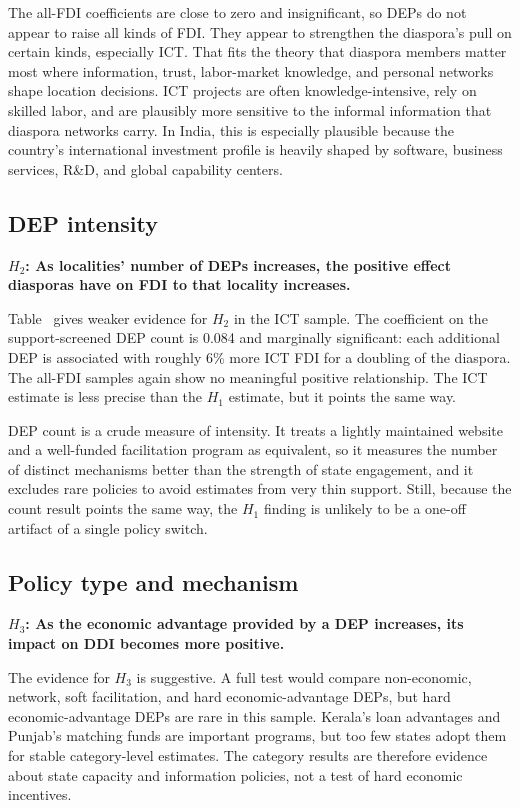 \documentclass[12pt]{article}
\let\oldsubsection\subsection
\renewcommand{\subsection}{\FloatBarrier\oldsubsection}
\begin{document}
The all-FDI coefficients are close to zero and insignificant, so DEPs do not appear to raise all kinds of FDI. They appear to strengthen the diaspora's pull on certain kinds, especially ICT. That fits the theory that diaspora members matter most where information, trust, labor-market knowledge, and personal networks shape location decisions. ICT projects are often knowledge-intensive, rely on skilled labor, and are plausibly more sensitive to the informal information that diaspora networks carry. In India, this is especially plausible because the country's international investment profile is heavily shaped by software, business services, R\&D, and global capability centers.

\subsection{DEP intensity}

\textbf{$H_2$: As localities' number of DEPs increases, the positive effect diasporas have on FDI to that locality increases.}

Table~ gives weaker evidence for $H_2$ in the ICT sample. The coefficient on the support-screened DEP count is 0.084 and marginally significant: each additional DEP is associated with roughly 6\% more ICT FDI for a doubling of the diaspora. The all-FDI samples again show no meaningful positive relationship. The ICT estimate is less precise than the $H_1$ estimate, but it points the same way.

DEP count is a crude measure of intensity. It treats a lightly maintained website and a well-funded facilitation program as equivalent, so it measures the number of distinct mechanisms better than the strength of state engagement, and it excludes rare policies to avoid estimates from very thin support. Still, because the count result points the same way, the $H_1$ finding is unlikely to be a one-off artifact of a single policy switch.

\subsection{Policy type and mechanism}

\textbf{$H_3$: As the economic advantage provided by a DEP increases, its impact on DDI becomes more positive.}

The evidence for $H_3$ is suggestive. A full test would compare non-economic, network, soft facilitation, and hard economic-advantage DEPs, but hard economic-advantage DEPs are rare in this sample. Kerala's loan advantages and Punjab's matching funds are important programs, but too few states adopt them for stable category-level estimates. The category results are therefore evidence about state capacity and information policies, not a test of hard economic incentives.
\end{document}

